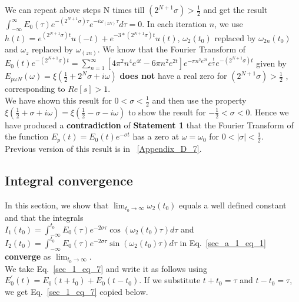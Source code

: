 \documentclass[11pt]{elsarticle}
\begin{document}
We can repeat above steps N times till $(2^{N+1} \sigma) > \frac{1}{2}$ and get the result $\int_{-\infty}^{\infty}    E_0(\tau) e^{-(2^{N+1} \sigma) \tau} e^{-i \omega_{(zN)} \tau} d\tau = 0$. In each iteration $n$, we use $h(t)=  e^{ (2^{N+1} \sigma) t} u(-t) + e^{ - 3*(2^{N+1} \sigma) t} u(t) $, $\omega_2(t_0)$ replaced by $\omega_{2n}(t_0)$ and $\omega_z$ replaced by $\omega_{(zn)}$. We know that  the Fourier Transform of $E_{0}(t) e^{-(2^{N+1} \sigma) t} =    \sum_{n=1}^{\infty}  [ 4 \pi^{2} n^{4} e^{4t}    - 6 \pi n^{2}   e^{2t} ]  e^{- \pi n^{2} e^{2t}} e^{\frac{t}{2}} e^{-(2^{N+1} \sigma) t}$ given by $E_{p\omega N}(\omega)=\xi(\frac{1}{2}+ 2^N \sigma + i \omega)$ \textbf{does not} have a real zero for $(2^{N+1} \sigma) > \frac{1}{2}$ , corresponding to $Re[s] > 1$. \\%

We have shown this result for $0 < \sigma < \frac{1}{2}$ and then use the property $\xi(\frac{1}{2} + \sigma + i \omega) = \xi(\frac{1}{2} - \sigma - i \omega)$ to show the result for $-\frac{1}{2} < \sigma < 0$. Hence we have produced a \textbf{contradiction} of  \textbf{Statement 1} that the Fourier Transform of the function $E_p(t) = E_0(t) e^{-\sigma t} $ has a zero at $\omega = \omega_{0}$ for  $0 < |\sigma| < \frac{1}{2}$.\\

Previous version of this result is in ~\ref{Appendix_D_7}.

\subsection{\label{sec:Section_A_1_1} \textbf{ Integral convergence} \protect\\  \lowercase{} }

In this section, we show that $\lim_{t_0 \to \infty} \omega_{2}(t_0)$ equals a well defined constant and that the integrals \\$I_1(t_0) =  \int_{-\infty}^{t_0}     E_{0}( \tau)  e^{ -2 \sigma \tau}  \cos{ (\omega_2(t_0) \tau)} d\tau$ and $I_2(t_0) =  \int_{-\infty}^{t_0}  E_{0}( \tau)  e^{ -2 \sigma \tau}  \sin{ (\omega_2(t_0) \tau)} d\tau$ in Eq.~\ref{sec_a_1_eq_1} \textbf{converge} as $\lim_{t_0 \to \infty}$. \\

We take Eq.~\ref{sec_1_eq_7} and write it as follows using $E_{0}^{'}(t)  = E_0(t+t_0) + E_0(t-t_0) $. If we substitute $t+t_0=\tau$ and $t-t_0=\tau$, we get Eq.~\ref{sec_1_eq_7} copied below.
\end{document}

